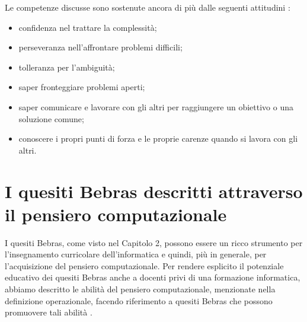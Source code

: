 \documentclass[12pt]{report}
\begin{document}
Le competenze discusse sono sostenute ancora di più dalle seguenti attitudini \cite{attitudiniCT}:
\begin{itemize}
	\item confidenza nel trattare la complessità;
	\item perseveranza nell'affrontare problemi difficili;
	\item tolleranza per l'ambiguità;
	\item saper fronteggiare problemi aperti;
	\item saper comunicare e lavorare con gli altri per raggiungere un obiettivo o una soluzione comune;
	\item conoscere i propri punti di forza e le proprie carenze quando si lavora con gli altri.
\end{itemize}

\section{I quesiti Bebras descritti attraverso il pensiero computazionale} \label{ClassCT}
I quesiti Bebras, come visto nel Capitolo 2, possono essere un ricco strumento per l'insegnamento curricolare dell'informatica e quindi, più in generale, per l'acquisizione del pensiero computazionale.
Per rendere esplicito il potenziale educativo dei quesiti Bebras anche a docenti privi di una formazione informatica, abbiamo descritto le abilità del pensiero computazionale, menzionate nella definizione operazionale, facendo riferimento a quesiti Bebras che possono promuovere tali abilità \cite{LonatiISSEP2017}.
\end{document}
